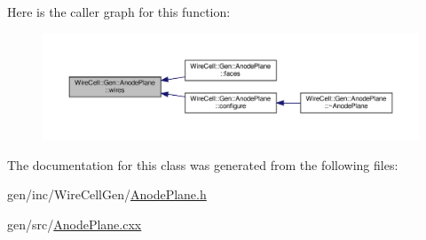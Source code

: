 Here is the caller graph for this function\+:
\nopagebreak
\begin{figure}[H]
\begin{center}
\leavevmode
\includegraphics[width=350pt]{class_wire_cell_1_1_gen_1_1_anode_plane_ad16d32c787a7ee9ea8c6c556bbab2e4f_icgraph}
\end{center}
\end{figure}


The documentation for this class was generated from the following files\+:\begin{DoxyCompactItemize}
\item 
gen/inc/\+Wire\+Cell\+Gen/\hyperlink{_anode_plane_8h}{Anode\+Plane.\+h}\item 
gen/src/\hyperlink{_anode_plane_8cxx}{Anode\+Plane.\+cxx}\end{DoxyCompactItemize}
